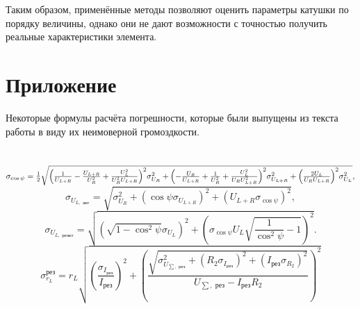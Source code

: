 \documentclass[a4paper,12pt]{article} %
\begin{document}
Таким образом, применённые методы позволяют оценить параметры катушки по порядку величины, однако они не дают возможности с точностью получить реальные характеристики элемента.
\newpage
\appendix
\section{Приложение}
Некоторые формулы расчёта погрешности, которые были выпущены из текста работы в виду их неимоверной громоздкости.
\\
\\
\\
$
\normalsize {\sigma _{\cos \psi }} = \frac{1}{2}\sqrt {{{\left( {\frac{1}{{{U_{L + R}}}} - \frac{{{U_{L + R}}}}{{U_R^2}} + \frac{{U_L^2}}{{U_R^2{U_{L + R}}}}} \right)}^2}{\sigma_{{U_R}}^2} + {{\left( { - \frac{{{U_R}}}{{{U_{L + R}}}} + \frac{1}{{U_R^2}} + \frac{{U_L^2}}{{{U_R}U_{L + R}^2}}} \right)}^2}{\sigma_{{U_{L + R}}}^2} + {{\left( {\frac{{2{U_L}}}{{{U_R}{U_{L + R}}}}} \right)}^2}{\sigma_{{U_L}}^2}},
$
\begin{equation*}
{\sigma _{{U_{L,\text{ акт}}}}} = \sqrt {\sigma _{{U_R}}^2 + {{\left( {\cos \psi {\sigma _{{U_{L + R}}}}} \right)}^2} + {{\left( {{U_{L + R}}{\sigma _{\cos \psi }}} \right)}^2}},
\end{equation*}
\begin{equation*}
{\sigma _{{U_{L,\text{ реакт}}}}} = \sqrt {{{\left( {\sqrt {1 - {{\cos }^2}\psi } {\sigma _{{U_L}}}} \right)}^2} + {{\left( {{\sigma _{\cos \psi }}{U_L}\sqrt {\frac{1}{{{{\cos }^2}\psi }} - 1} } \right)}^2}}.
\end{equation*}
\begin{equation*}
{\sigma^\text{рез}_{{r_L}}} = {r_L}\sqrt {{{\left( {\frac{{{\sigma _{{I_{\text{рез}}}}}}}{{{I_{\text{рез}}}}}} \right)}^2} + {{\left( {\frac{{\sqrt {\sigma _{{U_{\sum ,\text{ рез}}}}^2 + {{\left( {{R_2}{\sigma _{{I_{\text{рез}}}}}} \right)}^2} + {{\left( {{I_{\text{рез}}}{\sigma _{{R_2}}}} \right)}^2}} }}{{{U_{\sum ,\text{ рез}}} - {I_{\text{рез}}}{R_2}}}} \right)}^2}}
\end{equation*}
\end{document}
